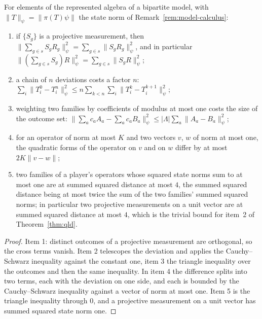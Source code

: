 \begin{lemma}
\label{lem:model-state-calculus}
\leanok
For elements of the represented algebra of a bipartite model, with $\|T\|_\psi = \|\pi(T)\psi\|$ the
state norm of Remark~\ref{rem:model-calculus}:
\begin{enumerate}
  \item if $\{S_g\}$ is a projective measurement, then
    $\|\sum_{g \in s} S_g R_g\|_\psi^2 = \sum_{g \in s} \|S_g R_g\|_\psi^2$, and in particular
    $\|(\sum_{g \in s} S_g) R\|_\psi^2 = \sum_{g \in s} \|S_g R\|_\psi^2$;
  \item a chain of $n$ deviations costs a factor $n$:
    $\sum_i \|T^0_i - T^n_i\|_\psi^2 \leq n \sum_{k < n} \sum_i \|T^k_i - T^{k+1}_i\|_\psi^2$;
  \item weighting two families by coefficients of modulus at most one costs the size of the outcome
    set: $\|\sum_a c_a A_a - \sum_a c_a B_a\|_\psi^2 \leq |\Lambda| \sum_a \|A_a - B_a\|_\psi^2$;
  \item for an operator of norm at most $K$ and two vectors $v$, $w$ of norm at most one, the
    quadratic forms of the operator on $v$ and on $w$ differ by at most $2K\|v - w\|$;
  \item two families of a player's operators whose squared state norms sum to at most one are at
    summed squared distance at most $4$, the summed squared distance being at most twice the sum of
    the two families' summed squared norms; in particular two projective measurements on a unit
    vector are at summed squared distance at most $4$, which is the trivial bound for item~2 of
    Theorem~\ref{thm:qld}.
\end{enumerate}
\end{lemma}

\begin{proof}
\leanok
Item 1: distinct outcomes of a projective measurement are orthogonal, so the cross terms vanish.
Item 2 telescopes the deviation and applies the Cauchy--Schwarz inequality against the constant
one, item 3 the triangle inequality over the outcomes and then the same inequality. In item 4 the
difference splits into two terms, each with the deviation on one side, and each is bounded by the
Cauchy--Schwarz inequality against a vector of norm at most one. Item 5 is the triangle inequality
through $0$, and a projective measurement on a unit vector has summed squared state norm one.
\end{proof}

